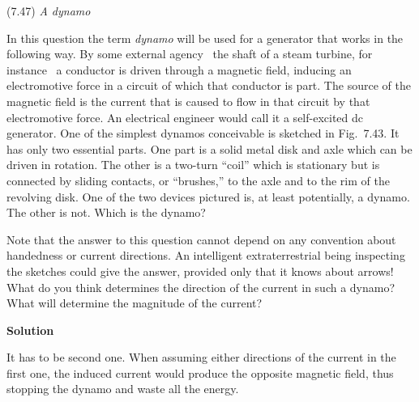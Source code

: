 \documentclass{article}
\begin{document}

\begin{homeworkProblem}
	(7.47) \textit{A dynamo}

	In this question the term \textit{dynamo} will be used for a generator that works in the following way. By some external agency \textendash\ the shaft of a steam turbine, for instance \textendash\ a conductor is driven through a magnetic field, inducing an electromotive force in a circuit of which that conductor is part. The source of the magnetic field is the current that is caused to flow in that circuit by that electromotive force. An electrical engineer would call it a self-excited dc generator. One of the simplest dynamos conceivable is sketched in Fig.~7.43. It has only two essential parts. One part is a solid metal disk and axle which can be driven in rotation. The other is a two-turn ``coil'' which is stationary but is connected by sliding contacts, or ``brushes,'' to the axle and to the rim of the revolving disk. One of the two devices pictured is, at least potentially, a dynamo. The other is not. Which is the dynamo?

	Note that the answer to this question cannot depend on any convention about handedness or current directions. An intelligent extraterrestrial being inspecting the sketches could give the answer, provided only that it knows about arrows! What do you think determines the direction of the current in such a dynamo? What will determine the magnitude of the current?

	\textbf{Solution}

	It has to be second one. When assuming either directions of the current in the first one, the induced current would produce the opposite magnetic field, thus stopping the dynamo and waste all the energy.
\end{homeworkProblem}
\end{document}

